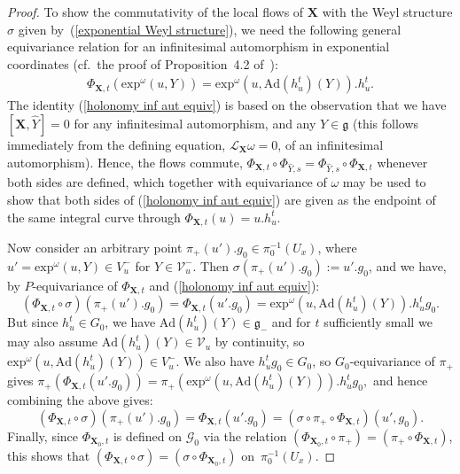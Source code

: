 \documentclass[11pt]{article}
\def\g{\mathfrak{g}}
\def\Gbdle{\mathcal{G}}
\def\Lie{\mathcal{L}}
\theoremstyle{plain}
\theoremstyle{definition}
\begin{document}
\begin{proof}
To show the commutativity of the local f\/lows of $\mathbf{X}$ with the Weyl structure $\sigma$ given by~(\ref{exponential Weyl structure}), we need the following general equivariance relation for an inf\/initesimal automorphism in exponential coordinates (cf.\ the proof of Proposition~4.2 of~\cite{Frances3}):
\begin{gather}
\Phi_{\mathbf{X},t}(\mathrm{exp}^{\omega}(u,Y)) = \mathrm{exp}^{\omega}(u,\mathrm{Ad}(h_u^t)(Y)).h_u^t. \label{holonomy inf aut equiv}
\end{gather}
The identity (\ref{holonomy inf aut equiv}) is based on the observation that we have $[\mathbf{X},\hat{Y}] = 0$ for any inf\/initesimal automorphism, and any $Y \in \g$ (this follows immediately from the def\/ining equation, $\Lie_{\mathbf{X}}\omega = 0$, of an inf\/initesimal automorphism). Hence, the f\/lows commute, $\Phi_{\mathbf{X},t} \circ \Phi_{\hat{Y},s} = \Phi_{\hat{Y},s} \circ \Phi_{\mathbf{X},t}$ whenever both sides are def\/ined, which together with equivariance of $\omega$ may be used to show that both sides of (\ref{holonomy inf aut equiv}) are given as the endpoint of the same integral curve through $\Phi_{\mathbf{X},t}(u) = u.h_u^t$.

Now consider an arbitrary point $\pi_+(u').g_0 \in \pi_0^{-1}(U_x)$, where $u' = \mathrm{exp}^{\omega}(u,Y) \in V_u^-$ for $Y \in \mathcal{V}_u^-$. Then $\sigma(\pi_+(u').g_0) := u'.g_0$, and we have, by $P$-equivariance of $\Phi_{\mathbf{X},t}$ and (\ref{holonomy inf aut equiv}):
\[
(\Phi_{\mathbf{X},t} \circ \sigma)(\pi_+(u').g_0) = \Phi_{\mathbf{X},t}(u'.g_0) = \mathrm{exp}^{\omega}(u,\mathrm{Ad}(h_u^t)(Y)).h_u^tg_0.
\]
But since $h_u^t \in G_0$, we have $\mathrm{Ad}(h_u^t)(Y) \in \g_-$ and for $t$ suf\/f\/iciently small we may also assume $\mathrm{Ad}(h_u^t)(Y) \in \mathcal{V}_u$ by continuity, so $\mathrm{exp}^{\omega}(u,\mathrm{Ad}(h_u^t)(Y)) \in V_u^-$. We also have $h_u^tg_0 \in G_0$, so $G_0$-equivariance of $\pi_+$ gives $\pi_+(\Phi_{\mathbf{X},t}(u'.g_0)) = \pi_+(\mathrm{exp}^{\omega}(u,\mathrm{Ad}(h_u^t)(Y))).h_u^tg_0,$ and hence combining the above gives:
\[
(\Phi_{\mathbf{X},t} \circ \sigma)(\pi_+(u').g_0) = \Phi_{\mathbf{X},t}(u'.g_0) = (\sigma \circ \pi_+ \circ \Phi_{\mathbf{X},t})(u',g_0).
\]
Finally, since $\Phi_{\mathbf{X}_0,t}$ is def\/ined on $\Gbdle_0$ via the relation $(\Phi_{\mathbf{X}_0,t} \circ \pi_+) = (\pi_+ \circ \Phi_{\mathbf{X},t})$, this shows that $(\Phi_{\mathbf{X},t} \circ \sigma) = (\sigma \circ \Phi_{\mathbf{X}_0,t})$ on~$\pi_0^{-1}(U_x)$.
\end{proof}
\end{document}

